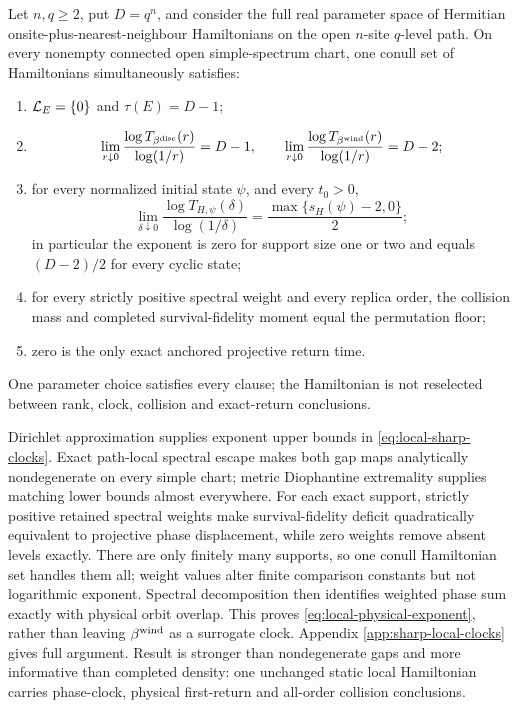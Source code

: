 \begin{theorem}
\label{thm:local-clock-capstone}
Let $n,q\ge2$, put $D=q^n$, and consider the full real parameter space of
Hermitian onsite-plus-nearest-neighbour Hamiltonians on the open $n$-site
$q$-level path.  On every nonempty connected open simple-spectrum chart,
one conull set of Hamiltonians simultaneously satisfies:
\begin{enumerate}[label=(\alph*),leftmargin=1.7em]
\item $\mathcal L_E=\{0\}$ and $\tau(E)=D-1$;
\item
\begin{equation}
 \lim_{r\downarrow0}
 \frac{\log T_{\beta^{\rm disc}}(r)}{\log(1/r)}=D-1,
 \qquad
 \lim_{r\downarrow0}
 \frac{\log T_{\beta^{\rm wind}}(r)}{\log(1/r)}=D-2;
 \label{eq:local-sharp-clocks}
\end{equation}
\item for every normalized initial state $\psi$, and every $t_0>0$,
\begin{equation}
 \boxed{\lim_{\delta\downarrow0}
 \frac{\log T_{H,\psi}(\delta)}{\log(1/\delta)}
 =\frac{\max\{s_H(\psi)-2,0\}}{2};}
 \label{eq:local-physical-exponent}
\end{equation}
in particular the exponent is zero for support size one or two and equals
$(D-2)/2$ for every cyclic state;
\item for every strictly positive spectral weight and every replica order,
the collision mass and completed survival-fidelity moment equal the
permutation floor;
\item zero is the only exact anchored projective return time.
\end{enumerate}
One parameter choice satisfies every clause; the Hamiltonian is not reselected
between rank, clock, collision and exact-return conclusions.
\end{theorem}

Dirichlet approximation supplies exponent upper bounds in
\eqref{eq:local-sharp-clocks}.  Exact path-local spectral escape makes both
gap maps analytically nondegenerate on every simple chart; metric
Diophantine extremality supplies matching lower bounds almost everywhere.
For each exact support, strictly positive retained spectral weights make
survival-fidelity deficit quadratically equivalent to projective phase
displacement, while zero weights remove absent levels exactly.  There are
only finitely many supports, so one conull Hamiltonian set handles them all;
weight values alter finite comparison constants but not logarithmic exponent.
Spectral decomposition then identifies weighted phase sum exactly with
physical orbit overlap.  This proves \eqref{eq:local-physical-exponent},
rather than leaving $\beta^{\rm wind}$ as a surrogate clock.  Appendix
\ref{app:sharp-local-clocks} gives full argument.  Result is stronger than
nondegenerate gaps and more informative than completed density: one unchanged
static local Hamiltonian carries phase-clock, physical first-return and
all-order collision conclusions.

